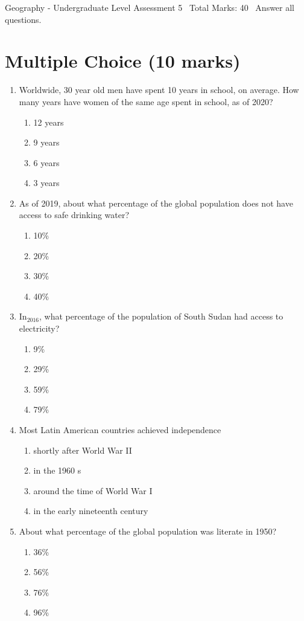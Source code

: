 \documentclass[12pt]{article}
\begin{document}
\begin{center}
Geography - Undergraduate Level Assessment 5 \
Total Marks: 40 \
Answer all questions.
\end{center}

\section*{Multiple Choice (10 marks)}
\begin{enumerate}[label=\arabic*.]
\item Worldwide, 30 year old men have spent 10 years in school, on average. How many years have women of the same age spent in school, as of 2020?
\begin{enumerate}[label=(\alph*)]
    \item 12 years
    \item 9 years
    \item 6 years
    \item 3 years
\end{enumerate}
\item As of 2019, about what percentage of the global population does not have access to safe drinking water?
\begin{enumerate}[label=(\alph*)]
    \item 10\%
    \item 20\%
    \item 30\%
    \item 40\%
\end{enumerate}
\item In$_{2016}$, what percentage of the population of South Sudan had access to electricity?
\begin{enumerate}[label=(\alph*)]
    \item 9\%
    \item 29\%
    \item 59\%
    \item 79\%
\end{enumerate}
\item Most Latin American countries achieved independence
\begin{enumerate}[label=(\alph*)]
    \item shortly after World War II
    \item in the 1960 s
    \item around the time of World War I
    \item in the early nineteenth century
\end{enumerate}
\item About what percentage of the global population was literate in 1950?
\begin{enumerate}[label=(\alph*)]
    \item 36\%
    \item 56\%
    \item 76\%
    \item 96\%
\end{enumerate}
\end{enumerate}
\end{document}
